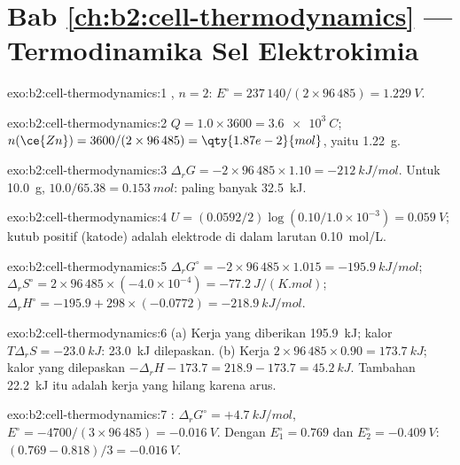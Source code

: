 \section*{Bab \ref{ch:b2:cell-thermodynamics} --- Termodinamika Sel Elektrokimia}

\begin{solution}{exo:b2:cell-thermodynamics:1}
, $n = 2$: $E^\circ = 237\,140/(2 \times 96\,485) =
\qty{1.229}{V}$.
\end{solution}

\begin{solution}{exo:b2:cell-thermodynamics:2}
$Q = 1.0 \times 3600 = \qty{3.6e3}{C}$; $n(\ce{Zn}) = 3600/(2 \times 96\,485) =
\qty{1.87e-2}{mol}$, yaitu \qty{1.22}{g}.
\end{solution}

\begin{solution}{exo:b2:cell-thermodynamics:3}
$\Delta_r G = -2 \times 96\,485 \times 1.10 = \qty{-212}{kJ/mol}$. Untuk
\qty{10.0}{g}, $10.0/65.38 = \qty{0.153}{mol}$: paling banyak \qty{32.5}{kJ}.
\end{solution}

\begin{solution}{exo:b2:cell-thermodynamics:4}
$U = (0.0592/2)\log(0.10/1.0 \times 10^{-3}) = \qty{0.059}{V}$; kutub
positif (katode) adalah elektrode di dalam larutan \qty{0.10}{mol/L}.
\end{solution}

\begin{solution}{exo:b2:cell-thermodynamics:5}
$\Delta_r G^\circ = -2 \times 96\,485 \times 1.015 = \qty{-195.9}{kJ/mol}$;
$\Delta_r S^\circ = 2 \times 96\,485 \times (-4.0 \times 10^{-4}) =
\qty{-77.2}{J/(K.mol)}$; $\Delta_r H^\circ = -195.9 + 298 \times (-0.0772) =
\qty{-218.9}{kJ/mol}$.
\end{solution}

\begin{solution}{exo:b2:cell-thermodynamics:6}
(a) Kerja yang diberikan \qty{195.9}{kJ}; kalor $T\Delta_r S = \qty{-23.0}{kJ}$:
\qty{23.0}{kJ} dilepaskan. (b) Kerja $2 \times 96\,485 \times 0.90 = \qty{173.7}{kJ}$; kalor yang dilepaskan $-\Delta_r H - 173.7 = 218.9 - 173.7 = \qty{45.2}{kJ}$. Tambahan \qty{22.2}{kJ} itu adalah kerja yang hilang
karena arus.
\end{solution}

\begin{solution}{exo:b2:cell-thermodynamics:7}
: $\Delta_r G^\circ = +\qty{4.7}{kJ/mol}$, $E^\circ =
-4700/(3 \times 96\,485) = \qty{-0.016}{V}$. Dengan $E_1^\circ = 0.769$ dan
$E_2^\circ = \qty{-0.409}{V}$: $(0.769 - 0.818)/3 = \qty{-0.016}{V}$.
\end{solution}

